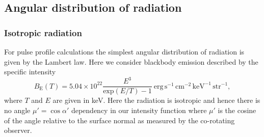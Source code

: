 \documentclass[iop, usenatbib]{emulateapj}
\newcommand{\be}{\begin{equation}}
\newcommand{\ee}{\end{equation}}
\newcommand{\sch}{Schwarzschild }
\newcommand{\rb}{\ensuremath{\bar{r}}}
\newcommand{\nub}{\ensuremath{\bar{\nu}}}
\newcommand{\zetab}{\ensuremath{\bar{\zeta}}}
\newcommand{\Bb}{\ensuremath{\bar{B}}}
\begin{document}

\subsection{Angular distribution of radiation}\label{sect:angular_distr}
\subsubsection{Isotropic radiation}

For pulse profile calculations the simplest angular distribution of radiation is given by the Lambert law.  
Here we consider blackbody emission described by the specific intensity
\begin{equation}
  B_{\mathrm{E}}(T) = 5.04 \times 10^{22} \frac{E^3}{\mathrm{exp}(E/T) -1}~\mathrm{erg}\,\mathrm{s}^{-1}\,\mathrm{cm}^{-2}\,\mathrm{keV}^{-1}\,\mathrm{str}^{-1},
\end{equation}
where $T$ and $E$ are given in keV.
Here the radiation is isotropic and hence there is no angle $\mu' = \cos\alpha'$ dependency in our intensity function where $\mu'$ is the cosine of the angle relative to the surface normal as measured by the co-rotating observer.
\end{document}
